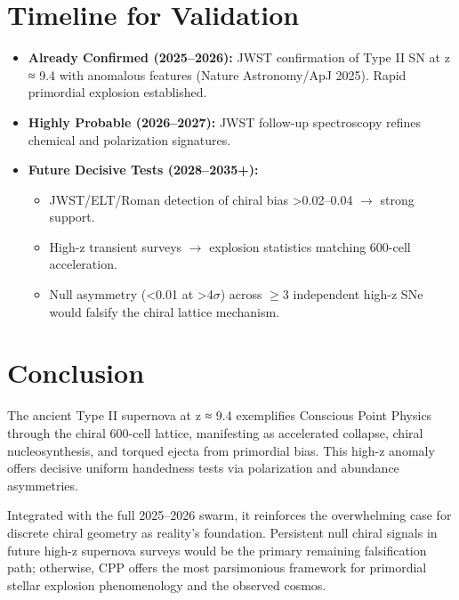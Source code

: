 \documentclass[11pt]{article}
\begin{document}
\section{Timeline for Validation}
\begin{itemize}
    \item \textbf{Already Confirmed (2025--2026):} JWST confirmation of Type II SN at z ≈ 9.4 with anomalous features (Nature Astronomy/ApJ 2025). Rapid primordial explosion established.
    \item \textbf{Highly Probable (2026--2027):} JWST follow-up spectroscopy refines chemical and polarization signatures.
    \item \textbf{Future Decisive Tests (2028--2035+):}
    \begin{itemize}
        \item JWST/ELT/Roman detection of chiral bias >0.02--0.04 $\to$ strong support.
        \item High-z transient surveys $\to$ explosion statistics matching 600-cell acceleration.
        \item Null asymmetry (<0.01 at >4$\sigma$) across $\geq 3$ independent high-z SNe would falsify the chiral lattice mechanism.
    \end{itemize}
\end{itemize}

\section{Conclusion}
The ancient Type II supernova at z ≈ 9.4 exemplifies Conscious Point Physics through the chiral 600-cell lattice, manifesting as accelerated collapse, chiral nucleosynthesis, and torqued ejecta from primordial bias. This high-z anomaly offers decisive uniform handedness tests via polarization and abundance asymmetries.  

Integrated with the full 2025--2026 swarm, it reinforces the overwhelming case for discrete chiral geometry as reality's foundation. Persistent null chiral signals in future high-z supernova surveys would be the primary remaining falsification path; otherwise, CPP offers the most parsimonious framework for primordial stellar explosion phenomenology and the observed cosmos.
\end{document}

